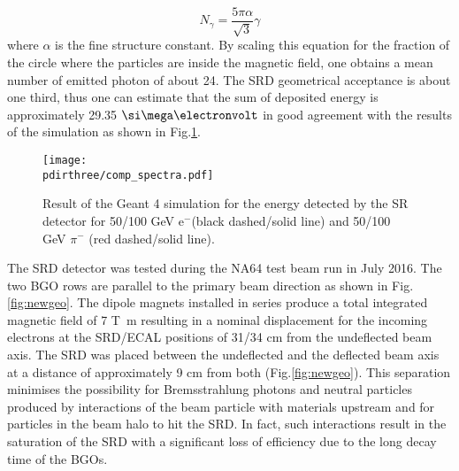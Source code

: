 \begin{equation}
N_\gamma = \frac{5 \pi \alpha}{\sqrt{3}}\gamma
\end{equation}
where $\alpha$ is the fine structure constant. 
By scaling this equation for the fraction of the circle where the particles are inside the magnetic field, one obtains a mean number of emitted photon of about 24.
The SRD geometrical acceptance is about one third,  thus one can estimate that the sum of deposited energy is approximately 29.35 $\mev$ in good agreement with the results of the simulation as shown in Fig.\ref{fig:SRspectrum}. 
 
\begin{figure}[htb!]
\centering
\texttt{[image: \\pdirthree/comp\_spectra.pdf]}
\caption[SR spectrum for different energy detected in the SRD]{Result of the Geant 4 simulation for the energy detected by the SR detector for 50/100 GeV e$^-$(black dashed/solid line) and 50/100 GeV $\pi^-$ (red dashed/solid line).}
\label{fig:SRspectrum}
\end{figure}

The SRD detector was tested during the NA64 test beam run in July 2016. The two BGO rows are parallel to the primary beam direction as shown in Fig.\ref{fig:newgeo}. The dipole magnets installed in series produce a total integrated magnetic field of 7 \si{\tesla\meter} \cite{Banerjee:2016tad} resulting in a nominal displacement for the incoming electrons at the SRD/ECAL positions of 31/34 cm from the undeflected beam axis. The SRD was placed between the undeflected and the deflected beam axis at a distance of approximately 9 cm from both (Fig.\ref{fig:newgeo}). This separation minimises the possibility for Bremsstrahlung photons and neutral particles produced by interactions of the beam particle with materials upstream and for particles in the beam halo to hit the SRD. In fact, such interactions result in the saturation of the SRD with a significant loss of efficiency due to the long decay time of the BGOs.


